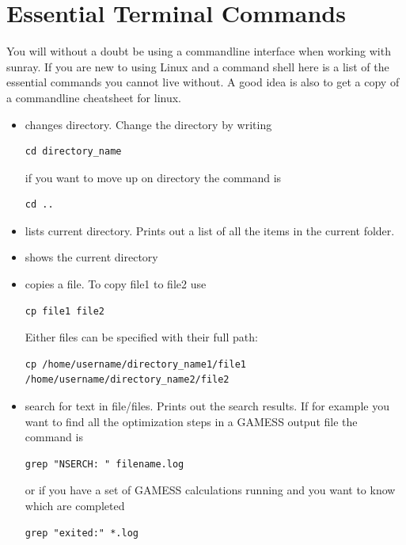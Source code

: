 \documentclass{article}
\begin{document}
\newpage


\section{Essential Terminal Commands}

You will without a doubt be using a commandline interface when working with sunray.
If you are new to using Linux and a command shell here is a list of the essential commands you cannot live without.
A good idea is also to get a copy of a commandline cheatsheet for linux.\\

\begin{itemize}

    \item {} changes directory. Change the directory by writing
\begin{lstlisting}
cd directory_name
\end{lstlisting}

        if you want to move up on directory the command is
\begin{lstlisting}
cd ..
\end{lstlisting}

    \item {} lists current directory. Prints out a list of all the items in the current folder.
    
    \item {} shows the current directory
    
    \item {} copies a file. To copy file1 to file2 use
\begin{lstlisting}
cp file1 file2
\end{lstlisting}
Either files can be specified with their full path:
\begin{lstlisting}
cp /home/username/directory_name1/file1 /home/username/directory_name2/file2
\end{lstlisting}

    \item {} search for text in file/files. Prints out the search results. If for example you want to find all the optimization steps in a GAMESS output file the command is
\begin{lstlisting}
grep "NSERCH: " filename.log
\end{lstlisting}
        or if you have a set of GAMESS calculations running and you want to know which are completed
\begin{lstlisting}
grep "exited:" *.log
\end{lstlisting}


\end{itemize}
\end{document}
